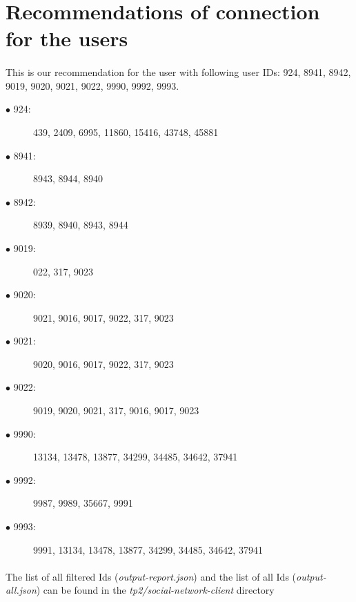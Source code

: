\section{Recommendations of connection for the users} \label{T6}

\paragraph{}This is our recommendation for the user with following user IDs: 924, 8941, 8942,
9019, 9020, 9021, 9022, 9990, 9992, 9993.\\
\begin{description}
  \item[$\bullet$ 924: ] 439, 2409, 6995, 11860, 15416, 43748, 45881
  \item[$\bullet$ 8941: ] 8943,
        8944,
        8940
  \item[$\bullet$ 8942: ]8939,
        8940,
        8943,
        8944
  \item[$\bullet$ 9019: ] 022,
        317,
        9023
  \item[$\bullet$ 9020: ]  9021,
        9016,
        9017,
        9022,
        317,
        9023
  \item[$\bullet$ 9021: ] 9020,
        9016,
        9017,
        9022,
        317,
        9023
  \item[$\bullet$ 9022: ] 9019,
        9020,
        9021,
        317,
        9016,
        9017,
        9023
  \item[$\bullet$ 9990: ] 13134,
        13478,
        13877,
        34299,
        34485,
        34642,
        37941
  \item[$\bullet$ 9992: ] 9987,
        9989,
        35667,
        9991
  \item[$\bullet$ 9993: ] 9991,
        13134,
        13478,
        13877,
        34299,
        34485,
        34642,
        37941
\end{description}
\paragraph{}The list of all filtered Ids (\emph{output-report.json}) and the list of all Ids (\emph{output-all.json}) can be found in the \emph{tp2/social-network-client}  directory \\